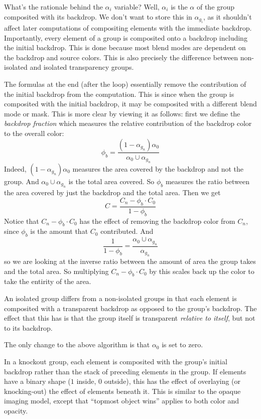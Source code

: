 What's the rationale behind the $\alpha_i$ variable?
Well, $\alpha_i$ is the $\alpha$ of the group composited with its backdrop.
We don't want to store this in $\alpha_{g_i}$, as it shouldn't affect later computations of compositing
elements with the immediate backdrop.
Importantly, every element of a group is composited onto a backdrop including the initial backdrop.
This is done because most blend modes are dependent on the backdrop and source colors.
This is also precisely the difference between non-isolated and isolated transparency groups.

The formulas at the end (after the loop) essentially remove the contribution of the initial backdrop from
the computation.
This is since when the group is composited with the initial backdrop, it may be composited with a different
blend mode or mask.
This is more clear by viewing it as follows: first we define the {\it backdrop fraction} which measures the
relative contribution of the backdrop color to the overall color:
$$ \phi_b = \frac{(1-\alpha_{g_n})\alpha_0}{\alpha_0\cup\alpha_{g_n}} $$
Indeed, $(1-\alpha_{g_n})\alpha_0$ measures the area covered by the backdrop and not the group.
And $\alpha_0\cup\alpha_{g_n}$ is the total area covered.
So $\phi_b$ measures the ratio between the area covered by just the backdrop and the total area.
Then we get
$$ C = \frac{C_n-\phi_b\cdot C_0}{1-\phi_b} $$
Notice that $C_n-\phi_b\cdot C_0$ has the effect of removing the backdrop color from $C_n$, since $\phi_b$
is the amount that $C_0$ contributed.
And
$$ \frac1{1-\phi_b} = \frac{\alpha_0\cup\alpha_{g_n}}{\alpha_{g_n}} $$
so we are looking at the inverse ratio between the amount of area the group takes and the total area.
So multiplying $C_n-\phi_b\cdot C_0$ by this scales back up the color to take the entirity of the area.


An isolated group differs from a non-isolated groups in that each element is composited with a transparent
backdrop as opposed to the group's backdrop.
The effect that this has is that the group itself is transparent {\it relative to itself}, but not to its
backdrop.

The only change to the above algorithm is that $\alpha_0$ is set to zero.


In a knockout group, each element is composited with the group's initial backdrop rather than the stack
of preceding elements in the group.
If elements have a binary shape ($1$ inside, $0$ outside), this has the effect of overlaying (or knocking-out)
the effect of elements beneath it.
This is similar to the opaque imaging model, except that ``topmost object wins'' applies to both color and
opacity.

